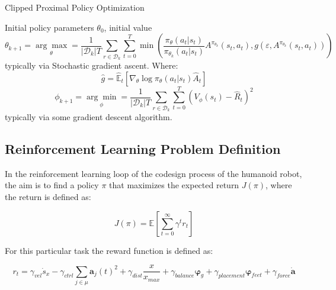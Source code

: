 \begin{algorithm}[H]
    \caption{Clipped Proximal Policy Optimization}
    \label{alg:ppo}
    \begin{algorithmic}[1]
        \REQUIRE Initial policy parameters $\theta _0$, initial value
        $$
            \theta _{k + 1} = \underset{\theta}{\arg\max} = \frac{1}{|\mathcal{D} _k|T} \sum _{r \in \mathcal{D} _k} \sum _{t = 0} ^{T} \min \left( \frac{\pi _{\theta} (a _t | s _t)}{\pi _{\theta_k} (a _t | s _t)} A ^{\pi _{\theta_k}} (s _t, a _t), g(\varepsilon, A ^{\pi _{\theta_k}}(s _t, a _t)) \right)
        $$
        typically via Stochastic gradient ascent. Where:
        $$
            \hat{g} = \hat{\mathbb{E}} _t \left[\nabla _{\theta}\log\pi _{\theta}(a _t | s _t) \hat{A} _t\right]
        $$
        $$
            \phi _{k + 1} = \underset{\phi}{\arg\min} = \frac{1}{|\mathcal{D} _k|T} \sum _{r \in \mathcal{D} _k} \sum _{t = 0} ^{T} \left(V _{\phi}(s _t) - \hat{R} _t \right)^2
        $$
        typically via some gradient descent algorithm.
        \ENDFOR
    \end{algorithmic}
\end{algorithm}

\subsection{Reinforcement Learning Problem Definition}

In the reinforcement learning loop of the codesign process of the humanoid robot, the aim is to find a policy $\pi$ that maximizes the expected return $J(\pi)$, where the return is defined as:

\begin{equation}
    J(\pi) = \mathbb{E} \left[ \sum_{t=0}^{\infty} \gamma ^t r_t \right]
\end{equation}

For this particular task the reward function is defined as:

\begin{equation}
    r_t = \gamma_{vel} \dot{s}_x - \gamma_{ctrl}\sum _{j \in \mu} \mathbf{a}_j(t) ^2 + \gamma_{dist} \frac{x}{x_{max}} + \gamma_{balance} \boldsymbol{\varphi}_g + \gamma_{placement} \boldsymbol{\varphi}_{feet} + \gamma_{force} \mathbf{\dot{a}}
\end{equation}

